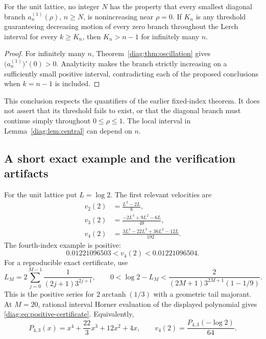 \begin{corollary}
\label{diag:cor:threshold}
For the unit lattice, no integer $N$ has the property that every smallest
diagonal branch $a_n^{(1)}(\rho)$, $n\geq N$, is nonincreasing near
$\rho=0$.  If $K_n$ is any threshold guaranteeing decreasing motion of
every zero branch throughout the Lerch interval for every $k\geq K_n$,
then $K_n>n-1$ for infinitely many $n$.
\end{corollary}

\begin{proof}
For infinitely many $n$, Theorem~\ref{diag:thm:oscillation} gives
$\bigl(a_n^{(1)}\bigr)'(0)>0$.  Analyticity makes the branch strictly
increasing on a sufficiently small positive interval, contradicting each
of the proposed conclusions when $k=n-1$ is included.
\end{proof}

This conclusion respects the quantifiers of the earlier fixed-index
theorem.  It does not assert that its threshold fails to exist, or that
the diagonal branch must continue simply throughout $0\leq\rho\leq1$.
The local interval in Lemma~\ref{diag:lem:central} can depend on $n$.

\subsection{A short exact example and the verification artifacts}
\label{diag:subsec:verification}

For the unit lattice put $L=\log2$.  The first relevant velocities are
\begin{align*}
 v_2(2)&=\frac{L^2-2L}{8},\\
 v_3(2)&=\frac{-2L^3+9L^2-6L}{48},\\
 v_4(2)&=\frac{3L^4-22L^3+36L^2-12L}{192}.
\end{align*}
The fourth-index example is positive:
\begin{equation}\label{diag:eq:positive-certificate}
 0.01221096503<v_4(2)<0.01221096504.
\end{equation}
For a reproducible exact certificate, use
\[
 L_M=2\sum_{j=0}^{M-1}\frac1{(2j+1)3^{2j+1}},\qquad
 0<\log2-L_M<
     \frac{2}{(2M+1)3^{2M+1}(1-1/9)}.
\]
This is the positive series for $2\operatorname{arctanh}(1/3)$ with a
geometric tail majorant.  At $M=20$, rational interval Horner evaluation
of the displayed polynomial gives \eqref{diag:eq:positive-certificate}.
Equivalently,
\[
 P_{4,3}(x)=x^4+\frac{22}{3}x^3+12x^2+4x,
 \qquad v_4(2)=\frac{P_{4,3}(-\log2)}{64}.
\]

